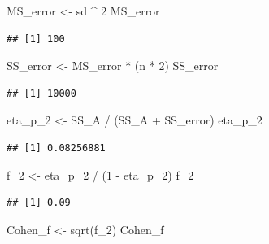 \documentclass[
]{book}
\newenvironment{Shaded}{\begin{snugshade}}{\end{snugshade}}
\newcommand{\DecValTok}[1]{\textcolor[rgb]{0.00,0.00,0.81}{#1}}
\newcommand{\FunctionTok}[1]{\textcolor[rgb]{0.00,0.00,0.00}{#1}}
\newcommand{\NormalTok}[1]{#1}
\newcommand{\OtherTok}[1]{\textcolor[rgb]{0.56,0.35,0.01}{#1}}
\newcommand{\SpecialCharTok}[1]{\textcolor[rgb]{0.00,0.00,0.00}{#1}}
\begin{document}
\begin{Shaded}
\begin{Highlighting}[]
\NormalTok{MS\_error }\OtherTok{\textless{}{-}}\NormalTok{ sd }\SpecialCharTok{\^{}} \DecValTok{2}
\NormalTok{MS\_error}
\end{Highlighting}
\end{Shaded}

\begin{verbatim}
## [1] 100
\end{verbatim}

\begin{Shaded}
\begin{Highlighting}[]
\NormalTok{SS\_error }\OtherTok{\textless{}{-}}\NormalTok{ MS\_error }\SpecialCharTok{*}\NormalTok{ (n }\SpecialCharTok{*} \DecValTok{2}\NormalTok{)}
\NormalTok{SS\_error}
\end{Highlighting}
\end{Shaded}

\begin{verbatim}
## [1] 10000
\end{verbatim}

\begin{Shaded}
\begin{Highlighting}[]
\NormalTok{eta\_p\_2 }\OtherTok{\textless{}{-}}\NormalTok{ SS\_A }\SpecialCharTok{/}\NormalTok{ (SS\_A }\SpecialCharTok{+}\NormalTok{ SS\_error)}
\NormalTok{eta\_p\_2}
\end{Highlighting}
\end{Shaded}

\begin{verbatim}
## [1] 0.08256881
\end{verbatim}

\begin{Shaded}
\begin{Highlighting}[]
\NormalTok{f\_2 }\OtherTok{\textless{}{-}}\NormalTok{ eta\_p\_2 }\SpecialCharTok{/}\NormalTok{ (}\DecValTok{1} \SpecialCharTok{{-}}\NormalTok{ eta\_p\_2)}
\NormalTok{f\_2}
\end{Highlighting}
\end{Shaded}

\begin{verbatim}
## [1] 0.09
\end{verbatim}

\begin{Shaded}
\begin{Highlighting}[]
\NormalTok{Cohen\_f }\OtherTok{\textless{}{-}} \FunctionTok{sqrt}\NormalTok{(f\_2)}
\NormalTok{Cohen\_f}
\end{Highlighting}
\end{Shaded}
\end{document}
